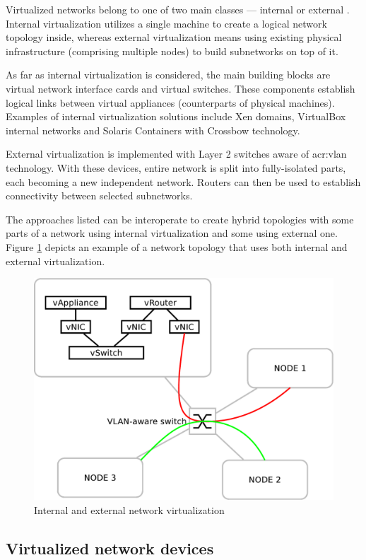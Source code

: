 \documentclass[11pt,openany]{book}
\begin{document}
        Virtualized networks belong to one of two main classes --- internal or external \cite{nsag}. Internal
        virtualization utilizes a single machine to create a logical network topology inside, whereas external
        virtualization means using existing physical infrastructure (comprising multiple nodes) to build subnetworks on
        top of it.

        As far as internal virtualization is considered, the main building blocks are virtual network interface cards
        and virtual switches. These components establish logical links between virtual appliances (counterparts of
        physical machines). Examples of internal virtualization solutions include Xen domains, VirtualBox internal
        networks \cite{vboxum} and Solaris Containers with Crossbow technology.

        External virtualization is implemented with Layer 2 switches aware of \gls{acr:vlan} technology. With these
        devices, entire network is split into fully-isolated parts, each becoming a new independent network. Routers can
        then be used to establish connectivity between selected subnetworks.

        The approaches listed can be interoperate to create hybrid topologies with some parts of a network using
        internal virtualization and some using external one. Figure \ref{fig:ctx:nvtypes} depicts an example of a
        network topology that uses both internal and external virtualization.
        
        \begin{figure}[H]
          \centering
          \includegraphics[width=.5\textwidth]{img/ctx/vnet-types.pdf}

          \caption{Internal and external network virtualization}
          \label{fig:ctx:nvtypes}
        \end{figure}


      \subsection{Virtualized network devices}
\end{document}
